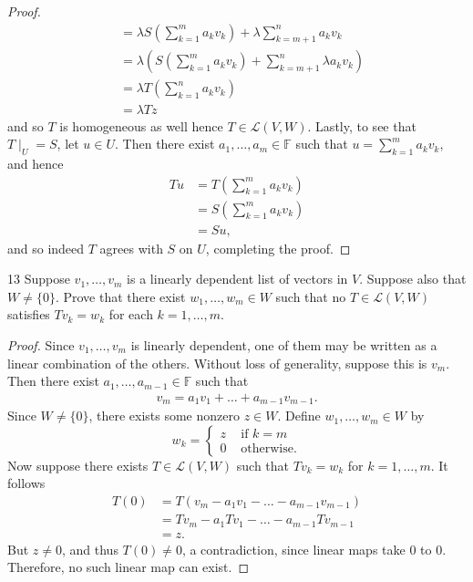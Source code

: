 \documentclass[11pt]{extarticle}
\newenvironment{problem}[1]{\begin{prob*}{#1}{}}{\end{prob*}}
\newcommand{\F}{\mathbb{F}}
\newcommand{\Hom}{\mathcal{L}}
\begin{document}
\begin{proof}
\begin{align*}
&= \lambda S\left(\sum_{k=1}^ma_kv_k\right) + \lambda\sum_{k=m+1}^n a_kv_k\\
&= \lambda\left(S\left(\sum_{k=1}^ma_kv_k\right) + \sum_{k=m+1}^n\lambda a_kv_k\right)\\
&= \lambda T\left(\sum_{k=1}^na_kv_k\right)\\
&= \lambda Tz
\end{align*}
and so $T$ is homogeneous as well hence $T\in\Hom(V,W)$.  Lastly, to see that $T\mid_U = S$, let $u\in U$.  Then there exist $a_1,\dots, a_m\in\F$ such that $u=\sum_{k=1}^ma_kv_k$, and hence
\begin{align*}
Tu &= T\left( \sum_{k=1}^ma_kv_k\right)\\
&= S\left(\sum_{k=1}^ma_kv_k\right)\\
&= Su,
\end{align*}
and so indeed $T$ agrees with $S$ on $U$, completing the proof.
\end{proof}

\begin{problem}{13}
Suppose $v_1,\dots, v_m$ is a linearly dependent list of vectors in $V$.  Suppose also that $W\neq\{0\}$.  Prove that there exist $w_1,\dots, w_m\in W$ such that no $T\in\Hom(V,W)$ satisfies $Tv_k=w_k$ for each $k = 1,\dots, m$.
\end{problem}
\begin{proof}
Since $v_1,\dots,v_m$ is linearly dependent, one of them may be written as a linear combination of the others.  Without loss of generality, suppose this is $v_m$.  Then there exist $a_1,\dots,a_{m-1}\in\F$ such that
\begin{align*}
v_m = a_1v_1 + \dots + a_{m-1}v_{m-1}.
\end{align*}
Since $W\neq\{0\}$, there exists some nonzero $z\in W$.  Define $w_1,\dots,w_m\in W$ by
\begin{equation*}
w_k = \begin{cases}z &\text{ if }k = m\\ 0 &\text{ otherwise.} \end{cases}
\end{equation*}
Now suppose there exists $T\in\Hom(V,W)$ such that $Tv_k = w_k$ for $k = 1,\dots, m$.  It follows
\begin{align*}
T(0) &= T(v_m - a_1v_1 - \dots - a_{m-1}v_{m-1})\\
 &= Tv_m - a_1Tv_1 - \dots - a_{m-1}Tv_{m-1}\\
&= z.
\end{align*}
But $z\neq0$, and thus $T(0)\neq 0$, a contradiction, since linear maps take $0$ to $0$.  Therefore, no such linear map can exist.
\end{proof}
\end{document}
